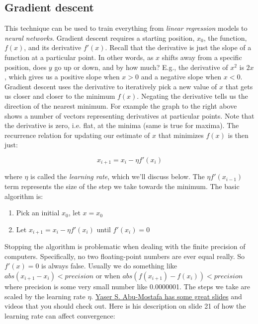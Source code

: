 \begin{fullwidth}
\subsection{Gradient descent}

This technique can be used to train everything from {\em linear regression} models to {\em neural networks}.  Gradient descent requires a starting position, $x_0$, the function, $f(x)$, and its derivative $f'(x)$.  Recall that the derivative is just the slope of a function at a particular point. In other words, as $x$ shifts away from a specific position, does $y$ go up or down, and by how much?  E.g., the derivative of $x^2$ is $2x$, which gives us a positive slope when $x>0$ and a negative slope when $x<0$.  Gradient descent uses the derivative to iteratively pick a new value of $x$ that gets us closer and closer to the minimum $f(x)$.  Negating the derivative tells us the direction of the nearest minimum. For example the graph to the right above shows a number of vectors representing derivatives at particular points. Note that the derivative is zero, i.e. flat, at the minima (same is true for maxima). The recurrence relation for updating our estimate of $x$ that minimizes $f(x)$ is then just:

\[
x_{i+1} = x_i - \eta f'(x_i)
\]

\noindent where $\eta$ is called the {\em learning rate}, which we'll discuss below. The $\eta f'(x_{i-1})$ term represents the size of the step we take towards the minimum. 
The basic algorithm is:

\begin{enumerate}
\item Pick an initial $x_0$, let $x = x_0$
\item Let $x_{i+1} = x_i - \eta f'(x_i)$ until $f'(x_i)=0$
\end{enumerate}

Stopping the algorithm is problematic when dealing with the finite precision of computers. Specifically, no two floating-point numbers are ever equal really. So $f'(x) = 0$ is always false. Usually we do something like $abs(x_{i+1} - x_i) < precision$ or when $abs(f(x_{i+1}) - f(x_i)) < precision$ where precision is some very small number like 0.0000001. The steps we take are scaled by the learning rate $\eta$.  \href{http://www.amlbook.com/slides/iTunesU_Lecture09_May_01.pdf}{Yaser S. Abu-Mostafa has some great slides} and videos that you should check out. Here is his description on slide 21 of how the learning rate can affect convergence:


\end{fullwidth}
